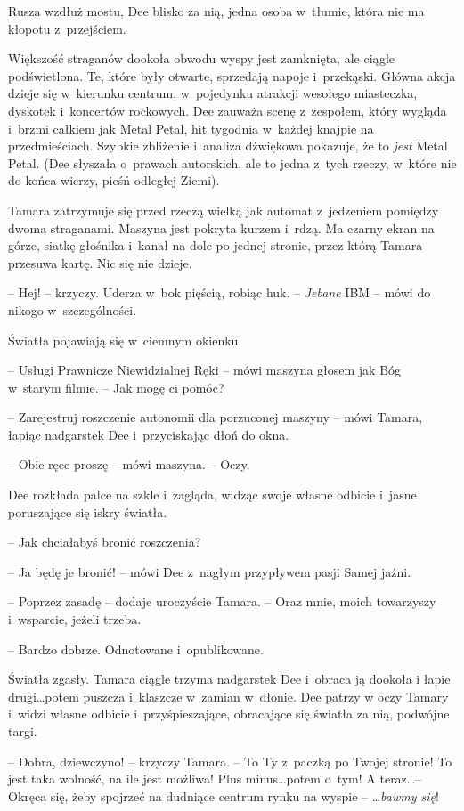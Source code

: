 \documentclass[oneside,polish,11pt,sfheadings]{mwbk}
\begin{document}
Rusza wzdłuż mostu, Dee blisko za nią, jedna osoba w~tłumie, która nie
ma kłopotu z~przejściem.

Większość straganów dookoła obwodu wyspy jest zamknięta, ale ciągle
podświetlona. Te, które były otwarte, sprzedają napoje i~przekąski.
Główna akcja dzieje się w~kierunku centrum, w~pojedynku atrakcji
wesołego miasteczka, dyskotek i~koncertów rockowych. Dee zauważa scenę z~zespołem, który wygląda i~brzmi całkiem jak Metal Petal, hit tygodnia w~każdej knajpie na przedmieściach. Szybkie zbliżenie i~analiza dźwiękowa
pokazuje, że to \emph{jest} Metal Petal. (Dee słyszała o~prawach
autorskich, ale to jedna z~tych rzeczy, w~które nie do końca wierzy,
pieśń odległej Ziemi).

Tamara zatrzymuje się przed rzeczą wielką jak automat z~jedzeniem
pomiędzy dwoma straganami. Maszyna jest pokryta kurzem i~rdzą. Ma czarny
ekran na górze, siatkę głośnika i~kanał na dole po jednej stronie, przez
którą Tamara przesuwa kartę. Nic się nie dzieje.

-- Hej! -- krzyczy. Uderza w~bok pięścią, robiąc huk. -- \emph{Jebane} IBM
-- mówi do nikogo w~szczególności.

Światła pojawiają się w~ciemnym okienku.

-- Usługi Prawnicze Niewidzialnej Ręki -- mówi maszyna głosem jak Bóg w~starym filmie. -- Jak mogę ci pomóc?

-- Zarejestruj roszczenie autonomii dla porzuconej maszyny -- mówi Tamara,
łapiąc nadgarstek Dee i~przyciskając dłoń do okna.

-- Obie ręce proszę -- mówi maszyna. -- Oczy.

Dee rozkłada palce na szkle i~zagląda, widząc swoje własne odbicie i~jasne poruszające się iskry światła.

-- Jak chciałabyś bronić roszczenia?

-- Ja będę je bronić! -- mówi Dee z~nagłym przypływem pasji Samej jaźni.

-- Poprzez zasadę -- dodaje uroczyście Tamara. -- Oraz mnie, moich
towarzyszy i~wsparcie, jeżeli trzeba.

-- Bardzo dobrze. Odnotowane i~opublikowane.

Światła zgasły. Tamara ciągle trzyma nadgarstek Dee i~obraca ją dookoła
i łapie drugi\ldots potem puszcza i~klaszcze w~zamian w~dłonie. Dee patrzy
w oczy Tamary i~widzi własne odbicie i~przyśpieszające, obracające się
światła za nią, podwójne targi.

-- Dobra, dziewczyno! -- krzyczy Tamara. -- To Ty z~paczką po Twojej stronie!
To jest taka wolność, na ile jest możliwa! Plus minus\ldots potem o~tym! A
teraz\ldots -- Okręca się, żeby spojrzeć na dudniące centrum rynku na wyspie
-- \ldots \emph{bawmy się}!
\end{document}
